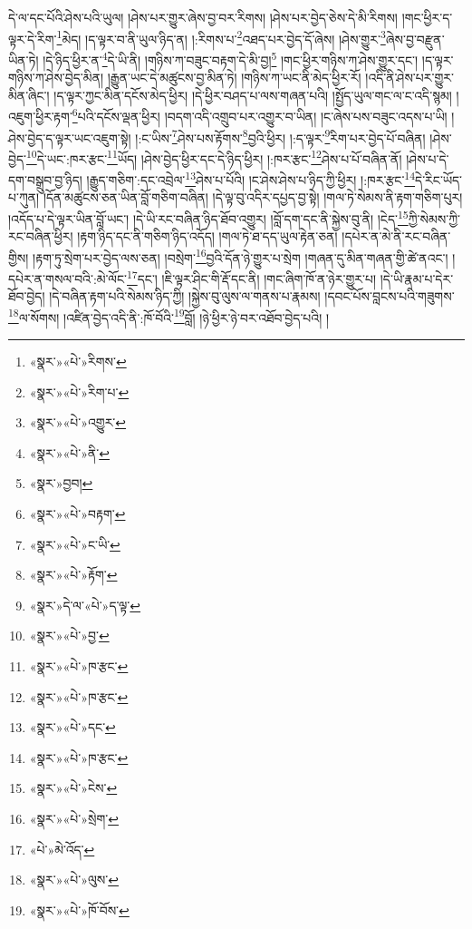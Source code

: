 དེ་ལ་དང་པོའི་ཤེས་པའི་ཡུལ། །ཤེས་པར་གྱུར་ཞེས་བྱ་བར་རིགས། །ཤེས་པར་བྱེད་ཅེས་དེ་མི་རིགས། །གང་ཕྱིར་ད་ལྟར་དེ་རིག་\footnote{«སྣར་»«པེ་»རིགས་}མེད། །ད་ལྟར་བ་ནི་ཡུལ་ཉིད་ན། །:རིགས་པ་\footnote{«སྣར་»«པེ་»རིག་པ་}འཐད་པར་བྱེད་དོ་ཞེས། །ཤེས་གྱུར་\footnote{«སྣར་»«པེ་»འགྱུར་}ཞེས་བྱ་བརྫུན་ཡིན་ཏེ། །དེ་ཉིད་ཕྱིར་ན་\footnote{«སྣར་»«པེ་»ནི་}དེ་ཡི་ནི། །གཉིས་ཀ་བཟུང་བརྟག་དེ་མི་བྱ།\footnote{«སྣར་»བྱབ།} །གང་ཕྱིར་གཉིས་ཀ་ཤེས་གྱུར་དང་། །ད་ལྟར་གཉིས་ཀ་ཤེས་བྱེད་མིན། །རྒྱུན་ཡང་དེ་མཚུངས་བྱ་མིན་ཏེ། །གཉིས་ཀ་ཡང་ནི་མེད་ཕྱིར་རོ། །འདི་ནི་ཤེས་པར་གྱུར་མིན་ཞིང་། །ད་ལྟར་ཀྱང་མིན་དངོས་མེད་ཕྱིར། །དེ་ཕྱིར་བཤད་པ་ལས་གཞན་པའི། །སྤྱོད་ཡུལ་གང་ལ་ང་འདི་སྙམ། །འཇུག་ཕྱིར་རྟག་\footnote{«སྣར་»«པེ་»བརྟག་}པའི་དངོས་ལྡན་ཕྱིར། །བདག་འདི་འགྲུབ་པར་འགྱུར་བ་ཡིན། །ང་ཞེས་པས་བཟུང་འདས་པ་ཡི། །ཤེས་བྱེད་ད་ལྟར་ཡང་འཇུག་སྟེ། །:ང་ཡིས་\footnote{«སྣར་»«པེ་»ང་ཡི་}ཤེས་པས་རྟོགས་\footnote{«སྣར་»«པེ་»རྟོག་}བྱའི་ཕྱིར། །:ད་ལྟར་\footnote{«སྣར་»དེ་ལ་«པེ་»ད་ལྟ་}རིག་པར་བྱེད་པོ་བཞིན། །ཤེས་བྱེད་\footnote{«སྣར་»«པེ་»བྱ་}དེ་ཡང་:ཁར་རྩང་\footnote{«སྣར་»«པེ་»ཁ་རྩང་}ཡོད། །ཤེས་བྱེད་ཕྱིར་དང་དེ་ཉིད་ཕྱིར། །:ཁར་རྩང་\footnote{«སྣར་»«པེ་»ཁ་རྩང་}ཤེས་པ་པོ་བཞིན་ནོ། །ཤེས་པ་དེ་དག་བསྒྲུབ་བྱ་ཉིད། །རྒྱུད་གཅིག་:དང་འབྲེལ་\footnote{«སྣར་»«པེ་»དང་}ཤེས་པ་པོའི། །ང་ཤེས་ཤེས་པ་ཉིད་ཀྱི་ཕྱིར། །:ཁར་རྩང་\footnote{«སྣར་»«པེ་»ཁ་རྩང་}དེ་རིང་ཡོད་པ་ཀུན། །དོན་མཚུངས་ཅན་ཡིན་བློ་གཅིག་བཞིན། །དེ་ལྟ་བུ་འདིར་དཔྱད་བྱ་སྟེ། །གལ་ཏེ་སེམས་ནི་རྟག་གཅིག་པུར། །འདོད་པ་དེ་ལྟར་ཡིན་བློ་ཡང་། །དེ་ཡི་རང་བཞིན་ཉིད་ཐོབ་འགྱུར། །བློ་དག་དང་ནི་སྐྱེས་བུ་ནི། །ངེད་\footnote{«སྣར་»«པེ་»ངེས་}ཀྱི་སེམས་ཀྱི་རང་བཞིན་ཕྱིར། །རྟག་ཉིད་དང་ནི་གཅིག་ཉིད་འདོད། །གལ་ཏེ་ཐ་དད་ཡུལ་རྟེན་ཅན། །དཔེར་ན་མེ་ནི་རང་བཞིན་གྱིས། །རྟག་ཏུ་སྲེག་པར་བྱེད་ལས་ཅན། །བསྲེག་\footnote{«སྣར་»«པེ་»སྲེག་}བྱའི་དོན་ཉེ་གྱུར་པ་སྲེག །གཞན་དུ་མིན་གཞན་གྱི་ཚེ་ནའང་། །དཔེར་ན་གསལ་བའི་:མེ་ལོང་\footnote{«པེ་»མེ་འོད་}དང་། །ཇི་ལྟར་ཤིང་གི་རྡོ་དང་ནི། །གང་ཞིག་ཁོ་ན་ཉེར་གྱུར་པ། །དེ་ཡི་རྣམ་པ་དེར་ཐོབ་བྱེད། །དེ་བཞིན་རྟག་པའི་སེམས་ཉིད་ཀྱི། །སྐྱེས་བུ་ལུས་ལ་གནས་པ་རྣམས། །དབང་པོས་བླངས་པའི་གཟུགས་\footnote{«སྣར་»«པེ་»ལུས་}ལ་སོགས། །འཛིན་བྱེད་འདི་ནི་:ཁོ་བོའི་\footnote{«སྣར་»«པེ་»ཁོ་བོས་}བློ། །ཉེ་ཕྱིར་ཉེ་བར་འཐོབ་བྱེད་པའི། །
